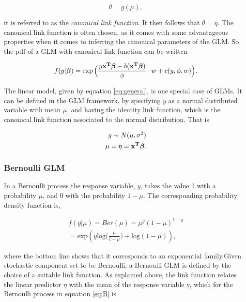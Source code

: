 \begin{equation}
\theta = g(\mu),
\end{equation}

it is referred to as the \textit{canonical link function}. It then follows that $\theta=\eta$. The canonical link function is often chosen, as it comes with some advantageous properties when it comes to inferring the canonical parameters of the GLM. So the pdf of a GLM with canonical link function can be written

\begin{equation}
   f(y|\bm{\beta}) =  \exp\Big(\frac{y  {\bf x^T} {\bm{ \beta}} - b( \bf x^T \bm{ \beta})}{\phi} \cdot w + c(y,\phi,w)\Big).
\end{equation}

The linear model, given by equation \ref{eq:general}, is one special case of GLMs. It can be defined in the GLM framework, by specifying $y$ as a normal distributed variable with mean $\mu$, and having the identity link function, which is the canonical link function associated to the normal distribution. That is

\begin{equation}
\begin{split}
y \sim N(\mu, \sigma^2) \\
\mu = \eta = \bf x^T \bm{ \beta}.
\end{split}
\end{equation}

\subsubsection{Bernoulli GLM}
\label{sec:Bernoulli}

In a Bernoulli process the response variable, $y$, takes the value 1 with a probability $\mu$, and 0 with the probability $1-\mu$. The corresponding probability density function is,

\begin{equation}
\begin{split}
\label{eq:B}
    f(y|\mu) = Ber(\mu) = \mu^{y}(1-\mu)^{1-y}\\
    = \text{exp} ( y  \text{log}\big(\frac{\mu}{1-\mu}\big) + \text{log}(1-\mu)),
\end{split}
\end{equation}

where the bottom line shows that it corresponds to an exponential family.Given stochastic component set to be Bernoulli, a Bernoulli GLM is defined by the choice of a suitable link function. As explained above, the link function relates the linear predictor $\eta$ with the mean of the response variable y, which for the Bernoulli process in equation \ref{eq:B} is 

